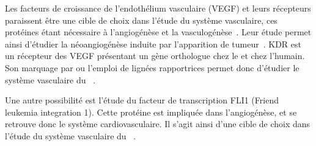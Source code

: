 \documentclass[\main/main.tex]{subfiles}
\begin{document}
Les facteurs de croissance de l'endothélium vasculaire (VEGF) et leurs récepteurs paraissent être une cible de choix dans l'étude du système vasculaire,
ces protéines étant nécessaire à  l'angiogénèse et la vasculogénèse~\cite{bahari_2007}.
%
Leur étude permet ainsi d'étudier la néoangiogénèse induite par l'apparition de tumeur~\cite{nicoli_2007}.
%
KDR est un récepteur des VEGF présentant un gène orthologue chez le \pz{} et chez l'humain.
%
Son marquage par \ihcie{} ou l'emploi de lignées rapportrices permet donc d'étudier le système vasculaire du \pz{}~\cite{savage_2019}.

Une autre possibilité est l'étude du facteur de transcription FLI1 (Friend leukemia integration 1).
%
Cette protéine est impliquée dans l'angiogénèse, et se retrouve donc le système cardiovasculaire.
%
Il s'agit ainsi d'une cible de choix dans l'étude du système vasculaire du \pz{}~\cite{letrado_2018}.
\end{document}
